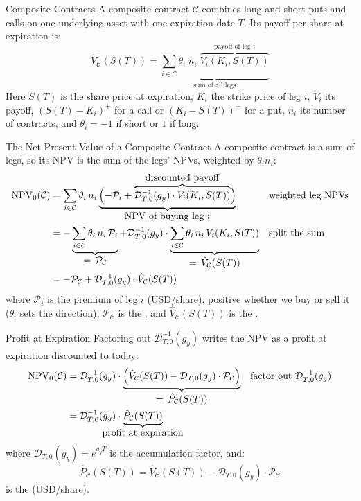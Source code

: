 \documentclass[aspectratio=169,11pt]{beamer}
\newcommand{\Cc}{\mathcal{C}}
\newcommand{\Dc}{\mathcal{D}}
\newcommand{\Pc}{\mathcal{P}}
\begin{document}
\begin{frame}{Composite Contracts}
  A composite contract $\Cc$ combines long and short puts and calls on one
  underlying asset with one expiration date $T$. Its payoff per share at
  expiration is:
  \begin{equation*}
    \hat{V}_{\Cc}(S(T)) = \underbrace{\sum_{i\in\Cc}\theta_{i}\;n_{i}\;\overbrace{V_{i}(K_{i},S(T))}^{\textstyle\text{payoff of leg } i}}_{\textstyle\text{sum of all legs}}
  \end{equation*}
  Here $S(T)$ is the share price at expiration, $K_{i}$ the strike price of leg
  $i$, $V_{i}$ its payoff, $(S(T)-K_{i})^{+}$ for a call or $(K_{i}-S(T))^{+}$ for
  a put, $n_{i}$ its number of contracts, and $\theta_{i}=-1$ if short or $1$ if
  long.
\end{frame}

\begin{frame}{The Net Present Value of a Composite Contract}
  A composite contract is a sum of legs, so its NPV is the sum of the legs'
  NPVs, weighted by $\theta_{i}n_{i}$:
  \begin{align*}
    \operatorname{NPV}_{0}(\Cc) &= \sum_{i\in\Cc}\theta_{i}\,n_{i}\underbrace{\Bigl(-\Pc_{i}+\overbrace{\Dc^{-1}_{T,0}(g_{y})\cdot V_{i}(K_{i},S(T))}^{\textstyle\text{discounted payoff}}\Bigr)}_{\textstyle\text{NPV of buying leg } i} && \text{weighted leg NPVs}\\
    &= -\underbrace{\sum_{i\in\Cc}\theta_{i}\,n_{i}\,\Pc_{i}}_{\textstyle=\,\Pc_{\Cc}}+\Dc^{-1}_{T,0}(g_{y})\cdot\underbrace{\sum_{i\in\Cc}\theta_{i}\,n_{i}\,V_{i}(K_{i},S(T))}_{\textstyle=\,\hat{V}_{\Cc}(S(T))} && \text{split the sum}\\
    &= -\Pc_{\Cc}+\Dc^{-1}_{T,0}(g_{y})\cdot\hat{V}_{\Cc}(S(T))
  \end{align*}
  where $\Pc_{i}$ is the premium of leg $i$ (USD/share), positive whether we buy
  or sell it ($\theta_{i}$ sets the direction), $\Pc_{\Cc}$ is the
  , and $\hat{V}_{\Cc}(S(T))$ is the
  .
\end{frame}

\begin{frame}{Profit at Expiration}
  Factoring out $\Dc^{-1}_{T,0}(g_{y})$ writes the NPV as a profit at expiration
  discounted to today:
  \begin{align*}
    \operatorname{NPV}_{0}(\Cc) &= \Dc^{-1}_{T,0}(g_{y})\cdot\underbrace{\Bigl(\hat{V}_{\Cc}(S(T))-\Dc_{T,0}(g_{y})\cdot\Pc_{\Cc}\Bigr)}_{\textstyle=\,\hat{P}_{\Cc}(S(T))} && \text{factor out }\Dc^{-1}_{T,0}(g_{y})\\
    &= \Dc^{-1}_{T,0}(g_{y})\cdot\underbrace{\hat{P}_{\Cc}(S(T))}_{\makebox[0pt]{profit at expiration}}
  \end{align*}
  where $\Dc_{T,0}(g_{y})=e^{g_{y}T}$ is the accumulation factor, and:
  \begin{equation*}
    \boxed{\hat{P}_{\Cc}(S(T)) = \hat{V}_{\Cc}(S(T)) - \Dc_{T,0}(g_{y})\cdot\Pc_{\Cc}}
  \end{equation*}
  is the  (USD/share).
\end{frame}
\end{document}
